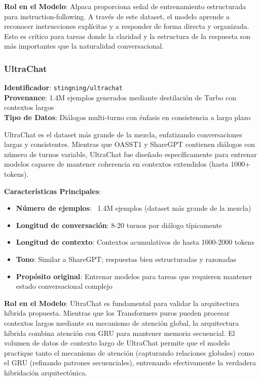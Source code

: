 \textbf{Rol en el Modelo}: Alpaca proporciona señal de entrenamiento estructurada para instruction-following. A través de este dataset, el modelo aprende a reconocer instrucciones explícitas y a responder de forma directa y organizada. Esto es crítico para tareas donde la claridad y la estructura de la respuesta son más importantes que la naturalidad conversacional.

\subsubsection{UltraChat}

\textbf{Identificador}: \texttt{stingning/ultrachat}~\cite{ding2023ultrachat} \\
\textbf{Provenance}: 1.4M ejemplos generados mediante destilación de Turbo con contextos largos \\
\textbf{Tipo de Datos}: Diálogos multi-turno con énfasis en consistencia a largo plazo

UltraChat es el dataset más grande de la mezcla, enfatizando conversaciones largas y consistentes. Mientras que OASST1 y ShareGPT contienen diálogos con número de turnos variable, UltraChat fue diseñado específicamente para entrenar modelos capaces de mantener coherencia en contextos extendidos (hasta 1000+ tokens).

\textbf{Características Principales}:
\begin{itemize}
    \item \textbf{Número de ejemplos}: ~1.4M ejemplos (dataset más grande de la mezcla)
    \item \textbf{Longitud de conversación}: 8-20 turnos por diálogo típicamente
    \item \textbf{Longitud de contexto}: Contextos acumulativos de hasta 1000-2000 tokens
    \item \textbf{Tono}: Similar a ShareGPT; respuestas bien estructuradas y razonadas
    \item \textbf{Propósito original}: Entrenar modelos para tareas que requieren mantener estado conversacional complejo
\end{itemize}

\textbf{Rol en el Modelo}: UltraChat es fundamental para validar la arquitectura híbrida propuesta. Mientras que los Transformers puros pueden procesar contextos largos mediante su mecanismo de atención global, la arquitectura híbrida combina atención con GRU para mantener memoria secuencial. El volumen de datos de contexto largo de UltraChat permite que el modelo practique tanto el mecanismo de atención (capturando relaciones globales) como el GRU (refinando patrones secuenciales), entrenando efectivamente la verdadera hibridación arquitectónica.


